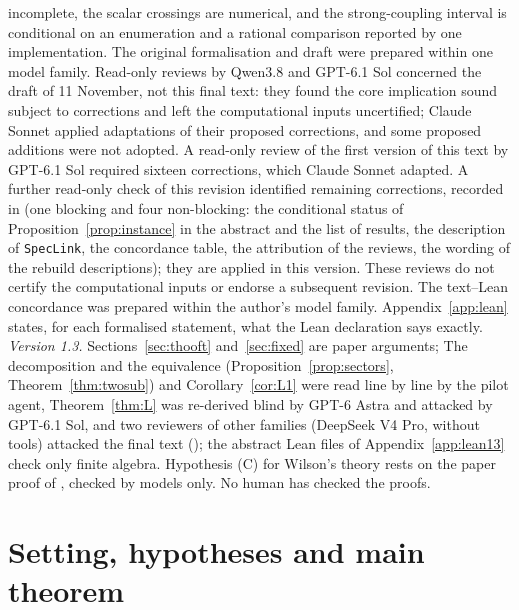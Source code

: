 \documentclass[11pt,a4paper]{article}
\theoremstyle{plain}
\theoremstyle{definition}
\theoremstyle{remark}
\numberwithin{equation}{section}
\begin{document}
incomplete, the scalar crossings are numerical, and the strong-coupling interval is conditional on an enumeration and a rational comparison reported by one implementation. The original formalisation and draft were prepared within one model family. Read-only reviews by Qwen3.8 and GPT-6.1 Sol concerned the draft of 11 November, not this final text: they found the core implication sound subject to corrections and left the computational inputs uncertified; Claude Sonnet applied adaptations of their proposed corrections, and some proposed additions were not adopted. A read-only review of the first version of this text by GPT-6.1 Sol required sixteen corrections, which Claude Sonnet adapted. A further read-only check of this revision identified remaining corrections, recorded in  (one blocking and four non-blocking: the conditional status of Proposition~\ref{prop:instance} in the abstract and the list of results, the description of \texttt{SpecLink}, the concordance table, the attribution of the reviews, the wording of the rebuild descriptions); they are applied in this version. These reviews do not certify the computational inputs or endorse a subsequent revision. The text--Lean concordance was prepared within the author's model family. Appendix~\ref{app:lean} states, for each formalised statement, what the Lean declaration says exactly. \emph{Version 1.3.} Sections~\ref{sec:thooft} and~\ref{sec:fixed} are paper arguments; The decomposition and the equivalence (Proposition~\ref{prop:sectors}, Theorem~\ref{thm:twosub}) and Corollary~\ref{cor:L1} were read line by line by the pilot agent, Theorem~\ref{thm:L} was re-derived blind by GPT-6 Astra and attacked by GPT-6.1 Sol, and two reviewers of other families (DeepSeek V4 Pro, without tools) attacked the final text (); the abstract Lean files of Appendix~\ref{app:lean13} check only finite algebra. Hypothesis (C) for Wilson's theory rests on the paper proof of \cite{TBv12}, checked by models only. No human has checked the proofs.

\section{Setting, hypotheses and main theorem}\label{sec:setting}
\end{document}
